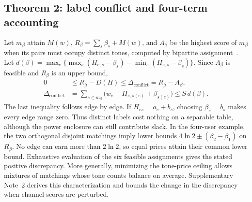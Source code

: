 \documentclass[lineno,pdflatex,sn-nature]{sn-jnl}
\begin{document}
\subsection*{Theorem 2: label conflict and four-term accounting}
Let \(m_\beta\) attain \(M(w)\), \(R_\beta=\sum_s\beta_s+M(w)\), and \(A_\beta\) be the highest score of \(m_\beta\) when its pairs must occupy distinct tones, computed by bipartite assignment~\cite{kuhn}. Let \(d(\beta)=\max_e\{\max_s(H_{e,s}-\beta_s)-\min_s(H_{e,s}-\beta_s)\}\). Since \(A_\beta\) is feasible and \(R_\beta\) is an upper bound,
\begin{equation}
\begin{aligned}
0 &\le R_\beta-D(H)\le\Delta_{\mathrm{conflict}}=R_\beta-A_\beta,\\
\Delta_{\mathrm{conflict}} &=\sum_{e\in m_\beta}\bigl(w_e-H_{e,s(e)}+\beta_{s(e)}\bigr)
       \le S\,d(\beta).
\end{aligned}
\label{eq:conflict}
\end{equation}
The last inequality follows edge by edge. If \(H_{es}=a_e+b_s\), choosing \(\beta_s=b_s\) makes every edge range zero. Thus distinct labels cost nothing on a separable table, although the power enclosure can still contribute slack. In the four-user example, the two orthogonal disjoint matchings imply lower bounds \(4\ln2\pm(\beta_2-\beta_1)\) on \(R_\beta\). No edge can earn more than \(2\ln2\), so equal prices attain their common lower bound. Exhaustive evaluation of the six feasible assignments gives the stated positive discrepancy. More generally, minimizing the tone-price ceiling allows mixtures of matchings whose tone counts balance on average. Supplementary Note~2 derives this characterization and bounds the change in the discrepancy when channel scores are perturbed.
\end{document}
